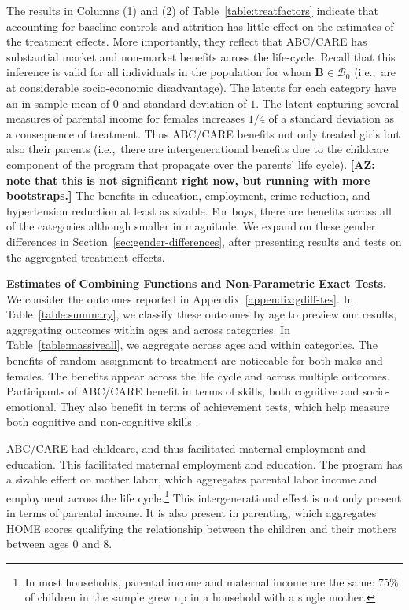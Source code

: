 The results in  Columns (1) and (2) of Table~\ref{table:treatfactors} indicate that accounting for baseline controls and attrition has little effect on the estimates of the treatment effects. More importantly, they reflect that ABC/CARE has substantial market and non-market benefits across the life-cycle. Recall that this inference is valid for all individuals in the population for whom $\bm{B} \in \mathcal{B}_0$ (i.e.,\ are at considerable socio-economic disadvantage). The latents for each category have an in-sample mean of $0$ and standard deviation of $1$. The latent capturing several measures of parental income for females increases $1/4$ of a standard deviation as a consequence of treatment. Thus ABC/CARE benefits not only treated girls but also their parents (i.e.,\ there are intergenerational benefits due to the childcare component of the program that propagate over the parents' life cycle). \textbf{[AZ: note that this is not significant right now, but running with more bootstraps.]} The benefits in education, employment, crime reduction, and hypertension reduction at least as sizable. For boys, there are benefits across all of the categories although smaller in magnitude. We expand on these gender differences in Section~\ref{sec:gender-differences}, after presenting results and tests on the aggregated treatment effects.

\textbf{Estimates of Combining Functions and Non-Parametric Exact Tests.} We consider the outcomes reported in Appendix~\ref{appendix:gdiff-tes}. In Table~\ref{table:summary}, we classify these outcomes by age to preview our results, aggregating outcomes within ages and across categories. In Table~\ref{table:massiveall}, we aggregate across ages and within categories. The benefits of random assignment to treatment are noticeable for both males and females. The benefits appear across the life cycle and across multiple outcomes. Participants of ABC/CARE benefit in terms of skills, both cognitive and socio-emotional. They also benefit in terms of achievement tests, which help measure both cognitive and non-cognitive skills \citep{Almlund_Duckworth_etal_2011_ecoval}.

ABC/CARE had childcare, and thus facilitated maternal employment and education. This facilitated maternal employment and education. The program has a sizable effect on mother labor, which aggregates parental labor income and employment across the life cycle.\footnote{In most households, parental income and maternal income are the same: 75\% of children in the sample grew up in a household with a single mother.} This intergenerational effect is not only present in terms of parental income. It is also present in parenting, which aggregates HOME scores qualifying the relationship between the children and their mothers between ages 0 and 8.

